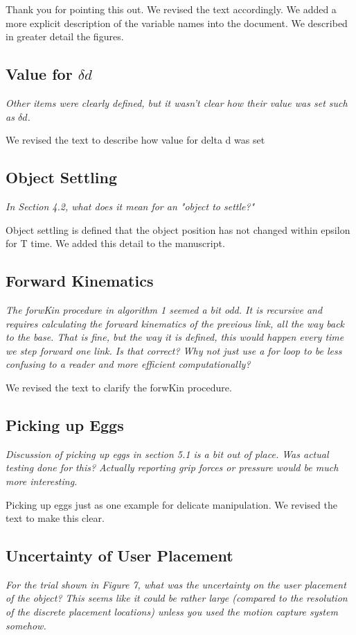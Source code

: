 \documentclass[letterpaper, 10 pt, twocolumn, conference]{article}
\begin{document}
Thank you for pointing this out. We revised the text accordingly. We added a more explicit description of the variable names into the document. We described in greater detail the figures. 

\subsection{Value for $\delta d$}
\textit{Other items were clearly defined, but it wasn't clear how their value was set such as $\delta d$.}

We revised the text to describe how value for delta d was set

\subsection{Object Settling}
\textit{In Section 4.2, what does it mean for an "object to settle?"}

Object settling is defined that the object position has not changed within epsilon for T time. We added this detail to the manuscript.

\subsection{Forward Kinematics}
\textit{The forwKin procedure in algorithm 1 seemed a bit odd. It is recursive and requires calculating the forward kinematics of the previous link, all the way back to the base. That is fine, but the way it is defined, this would happen every time we step forward one link. Is that correct? Why not just use a for loop to be less confusing to a reader and more efficient computationally?}

We revised the text to clarify the forwKin procedure.

\subsection{Picking up Eggs}
\textit{Discussion of picking up eggs in section 5.1 is a bit out of place. Was actual testing done for this? Actually reporting grip forces or pressure would be much more interesting.}

Picking up eggs just as one example for delicate manipulation. We revised the text to make this clear. 

\subsection{Uncertainty of User Placement}
\textit{For the trial shown in Figure 7, what was the uncertainty on the user placement of the object? This seems like it could be rather large (compared to the resolution of the discrete placement locations) unless you used the motion capture system somehow.}
\end{document}
